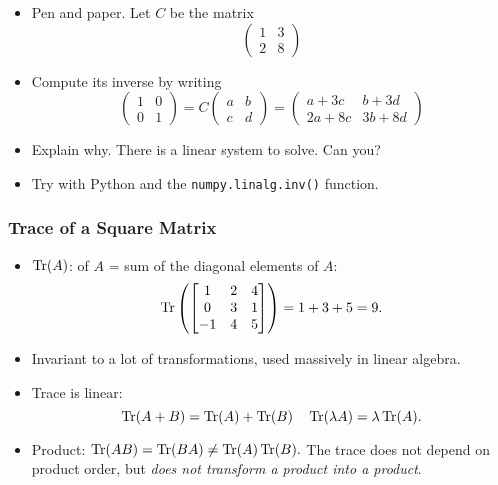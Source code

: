 \documentclass[8pt,dvipsnames]{beamer}
\newcommand{\myemph}[1]{{\color{blue}{#1}}}
\begin{document}
\begin{exercise}
  \begin{itemize}
  \item Pen and paper. Let $C$ be the matrix
    $$
    \begin{pmatrix}
      1 & 3\\
      2 & 8
    \end{pmatrix}
    $$
  \item Compute its inverse by writing
    $$
    \begin{pmatrix}
      1 & 0\\
      0 & 1
    \end{pmatrix} =
    C
    \begin{pmatrix}
      a & b\\
      c & d
    \end{pmatrix}
    =
    \begin{pmatrix}
      a + 3c & b + 3d\\
      2a + 8c& 3b + 8d
    \end{pmatrix}
    $$
  \item Explain why. There is a linear system to solve. Can you?
  \item Try with Python and the \texttt{numpy.linalg.inv()} function.
  \end{itemize}
\end{exercise}


\begin{frame}
  \frametitle{Trace of a Square Matrix}
  \begin{itemize}
  \item $\operatorname{Tr}(A)$: \myemph{Trace} of $A$ = sum of the diagonal elements of $A$:
    $$
    \operatorname{Tr}
    \left(\begin{bmatrix}
      1 & 2 & 4\\
      0 & 3 & 1\\
      -1& 4 & 5
    \end{bmatrix}
    \right) = 1 + 3 + 5 = 9.
    $$
    \vfill
  \item Invariant to a lot of transformations, used massively in linear algebra.
  \vfill
  \item Trace is linear:
    $$
    \operatorname{Tr}(A+ B) = \operatorname{Tr}(A) + \operatorname{Tr}(B)\quad\operatorname{Tr}(\lambda A) = \lambda\operatorname{Tr}(A).
    $$
  \vfill 
  \item Product: $\operatorname{Tr}(A B) = \operatorname{Tr}(B A) \not= \operatorname{Tr}(A)\operatorname{Tr}(B).$ The trace does not depend on product order, but \emph{does not transform a product into a product}.
  \end{itemize}
\end{frame}
\end{document}
